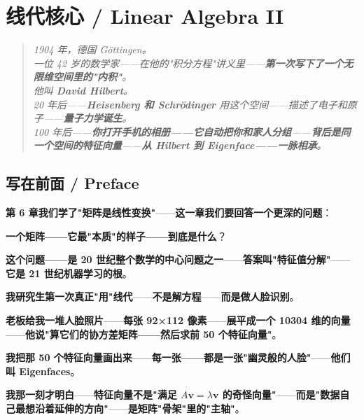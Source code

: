 
\chapter{线代核心 / Linear Algebra II}
\label{ch:linalg2}

\begin{quote}\itshape
1904 年，德国 Göttingen。\\
一位 42 岁的数学家——在他的"积分方程"讲义里——\textbf{第一次写下了一个无限维空间里的"内积"}。\\
他叫 \textbf{David Hilbert}。\\
20 年后——\textbf{Heisenberg 和 Schrödinger} 用这个空间——描述了电子和原子——\textbf{量子力学诞生}。\\[6pt]
100 年后——\textbf{你打开手机的相册——它自动把你和家人分组}——\textbf{背后是同一个空间的特征向量}——\textbf{从 Hilbert 到 Eigenface——一脉相承}。
\end{quote}

\section{写在前面 / Preface}

\textbf{第 6 章我们学了"矩阵是线性变换"}——\textbf{这一章我们要回答一个更深的问题}：

\textbf{一个矩阵——它最"本质"的样子——到底是什么}？

\textbf{这个问题——是 20 世纪整个数学的中心问题之一}——\textbf{答案叫"特征值分解"}——\textbf{它是 21 世纪机器学习的根}。

\textbf{我研究生第一次真正"用"线代}——\textbf{不是解方程}——\textbf{而是做人脸识别}。

\textbf{老板给我一堆人脸照片}——\textbf{每张 92×112 像素}——\textbf{展平成一个 10304 维的向量}——\textbf{他说"算它们的协方差矩阵——然后求前 50 个特征向量"}。

\textbf{我把那 50 个特征向量画出来}——\textbf{每一张——都是一张"幽灵般的人脸"}——\textbf{他们叫 Eigenfaces}。

\textbf{我那一刻才明白}——\textbf{特征向量不是"满足 $A\bm{v} = \lambda\bm{v}$ 的奇怪向量"}——\textbf{而是"数据自己最想沿着延伸的方向"}——\textbf{是矩阵"骨架"里的"主轴"}。

